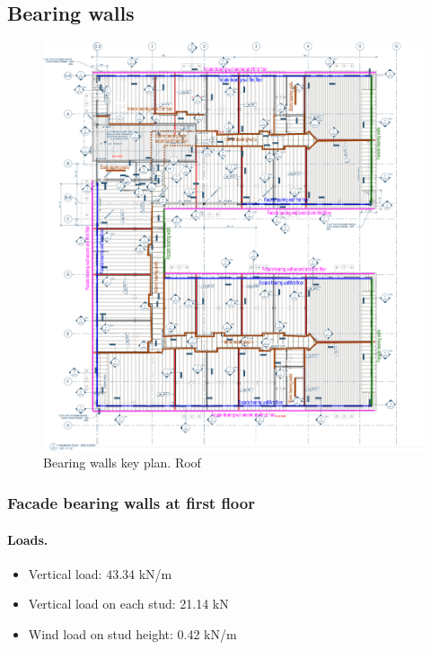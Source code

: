 \subsection{Bearing walls}

\begin{figure}
  \begin{center}
  \includegraphics[width=120mm]{figures/walls/bearing_walls_key_plan}
  \end{center}
  \caption{Bearing walls key plan. Roof}\label{fg_bearing_walls_key_plan}
\end{figure}

\subsubsection{Facade bearing walls at first floor}

\paragraph{Loads.}

\begin{itemize}
\item Vertical load: 43.34 kN/m
\item Vertical load on each stud: 21.14 kN
\item Wind load on stud height: 0.42 kN/m
\end{itemize}

